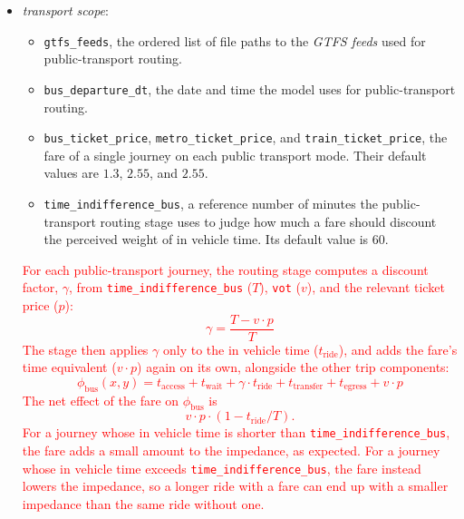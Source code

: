 \documentclass{article}
\newcommand{\notimpl}[1]{\textcolor{red}{#1}}
\begin{document}
\begin{itemize}
    \item \emph{transport scope}:
    \begin{itemize}
        \item \texttt{gtfs\_feeds}, the ordered list of file paths to the \emph{GTFS feeds}
        used for public-transport routing.
        \item \texttt{bus\_departure\_dt}, the date and time the model uses for public-transport
        routing.
        \item \texttt{bus\_ticket\_price}, \texttt{metro\_ticket\_price}, and
        \texttt{train\_ticket\_price}, the fare of a single journey on each public
        transport mode. Their default values are \(1.3\), \(2.55\), and \(2.55\).
        \item \texttt{time\_indifference\_bus}, a reference number of minutes the
        public-transport routing stage uses to judge how much a fare should discount
        the perceived weight of in vehicle time. Its default value is \(60\).
    \end{itemize}
    \notimpl{
    For each public-transport journey, the routing stage computes a discount factor,
    \(\gamma\), from \texttt{time\_\allowbreak indifference\_\allowbreak bus} (\(T\)), \texttt{vot} (\(v\)),
    and the relevant ticket price (\(p\)):
    \begin{equation}
        \gamma = \frac{T - v \cdot p}{T}
    \end{equation}
    The stage then applies \(\gamma\) only to the in vehicle time (\(t_{\text{ride}}\)),
    and adds the fare's time equivalent (\(v \cdot p\)) again on its own, alongside the
    other trip components:
    \begin{equation}
        \phi_{\text{bus}}(x,y) = t_{\text{access}} + t_{\text{wait}} + \gamma \cdot t_{\text{ride}} + t_{\text{transfer}} + t_{\text{egress}} + v \cdot p
    \end{equation}
    The net effect of the fare on \(\phi_{\text{bus}}\) is
    \begin{equation}
        v \cdot p \cdot \left(1 - t_{\text{ride}}/T\right).
    \end{equation}
    For a journey whose in vehicle time is shorter than \texttt{time\_\allowbreak indifference\_\allowbreak bus},
    the fare adds a small amount to the impedance, as expected. For a journey whose in
    vehicle time exceeds \texttt{time\_\allowbreak indifference\_\allowbreak bus}, the fare instead lowers the
    impedance, so a longer ride with a fare can end up with a smaller impedance than the
    same ride without one.
    }


\end{itemize}
\end{document}
